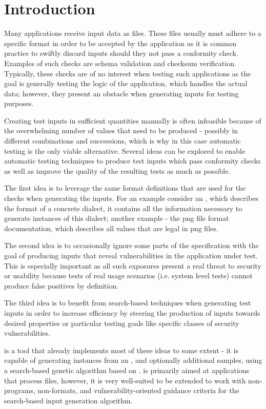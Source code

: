 \section{Introduction}
Many applications receive input data as files. These files usually must adhere to a specific format in order
to be accepted by the application as it is common practice to swiftly discard inputs should they not pass a
conformity check. Examples of such checks are schema validation and checksum verification. Typically, these
checks are of no interest when testing such applications as the goal is generally testing the logic of the
application, which handles the actual data; however, they present an obstacle when generating inputs for
testing purposes.

Creating test inputs in sufficient quantities manually is often infeasible because of the overwhelming number
of values that need to be produced - possibly in different combinations and successions, which is why in this
case automatic testing is the only viable alternative. Several ideas can be explored to enable automatic
testing techniques to produce test inputs which pass conformity checks as well as improve the quality of the
resulting tests as much as possible.

The first idea is to leverage the same format definitions that are used for the checks when generating the
inputs. For an example consider an \xsd, which describes the format of a concrete \xml dialect, it contains all
the information necessary to generate instances of this dialect; another example - the png file format
documentation, which describes all values that are legal in png files.

The second idea is to occasionally ignore some parts of the specification with the goal of producing inputs
that reveal vulnerabilities in the application under test. This is especially important as all such exposures
present a real threat to security or usability because tests of real usage scenarios (i.e. system level tests)
cannot produce false positives by definition.

The third idea is to benefit from search-based techniques when generating test inputs in order to increase
efficiency by steering the production of inputs towards desired properties or particular testing goals like
specific classes of security vulnerabilities.

\xmlmate{}\cite{Havrikov:2014:XEX:2635868.2661666} is a tool that already implements most of these ideas to
some extent - it is capable of generating \xml instances from an \xsd{}, and optionally additional \xml
samples, using a search-based genetic algorithm based on \evosuite{}\cite{fraser2013whole}. \xmlmate is
primarily aimed at \java applications that process \xml files, however, it is very well-suited to be extended
to work with non-\java programs, non-\xml formats, and vulnerability-oriented guidance criteria for the
search-based input generation algorithm.

